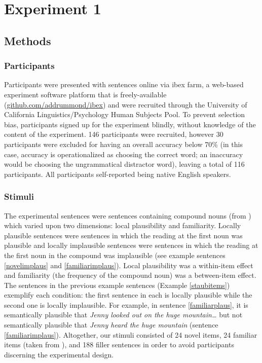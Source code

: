 \documentclass[
  12pt,
  letterpaper,
]{scrreport}
\begin{document}
\section{Experiment 1}\label{experiment-1}

\subsection{Methods}\label{methods}

\subsubsection{Participants}\label{participants}

Participants were presented with sentences online via ibex farm, a
web-based experiment software platform that is freely-available
(\url{github.com/addrummond/ibex}) and were recruited through the
University of California Linguistics/Psychology Human Subjects Pool. To
prevent selection bias, participants signed up for the experiment
blindly, without knowledge of the content of the experiment. 146
participants were recruited, however 30 participants were excluded for
having an overall accuracy below 70\% (in this case, accuracy is
operationalized as choosing the correct word; an inaccuracy would be
choosing the ungrammatical distractor word), leaving a total of 116
participants. All participants self-reported being native English
speakers.

\subsubsection{Stimuli}\label{stimuli}

The experimental sentences were sentences containing compound nouns
(from ) which varied upon two dimensions: local plausibility and
familiarity. Locally plausible sentences were sentences in which the
reading at the first noun was plausible and locally implausible
sentences were sentences in which the reading at the first noun in the
compound was implausible (see example sentences \ref{novelimplaus} and
\ref{familiarimplaus}). Local plausibility was a within-item effect and
familiarity (the frequency of the compound noun) was a between-item
effect. The sentences in the previous example sentences (Example
\ref{staubitems}) exemplify each condition: the first sentence in each
is locally plausible while the second one is locally implausible. For
example, in sentence \ref{familiarplaus}, it is semantically plausible
that \emph{Jenny looked out on the huge mountain\ldots{}} but not
semantically plausible that \emph{Jenny heard the huge mountain}
(sentence \ref{familiarimplaus}). Altogether, our stimuli consisted of
24 novel items, 24 familiar items (taken from
), and
188 filler sentences in order to avoid participants discerning the
experimental design.
\end{document}
